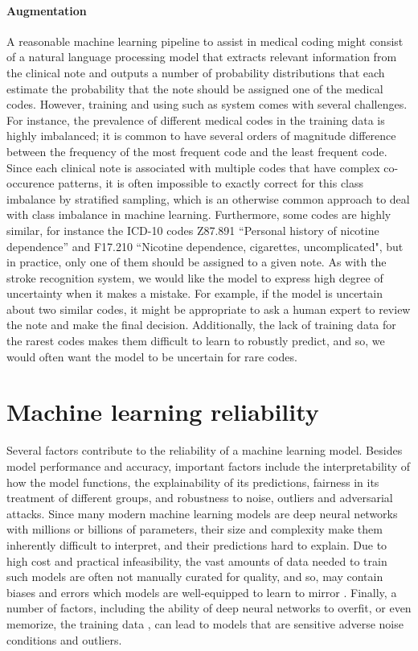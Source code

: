 \paragraph{Augmentation} A reasonable machine learning pipeline to assist in medical coding might consist of a natural language processing model that extracts relevant information from the clinical note and outputs a number of probability distributions that each estimate the probability that the note should be assigned one of the medical codes. 
However, training and using such as system comes with several challenges. 
For instance, the prevalence of different medical codes in the training data is highly imbalanced; it is common to have several orders of magnitude difference between the frequency of the most frequent code and the least frequent code. Since each clinical note is associated with multiple codes that have complex co-occurence patterns, it is often impossible to exactly correct for this class imbalance by stratified sampling, which is an otherwise common approach to deal with class imbalance in machine learning. 
Furthermore, some codes are highly similar, for instance the ICD-10 codes Z87.891 ``Personal history of nicotine dependence'' and F17.210 ``Nicotine dependence, cigarettes, uncomplicated", but in practice, only one of them should be assigned to a given note. 
As with the stroke recognition system, we would like the model to express high degree of uncertainty when it makes a mistake. For example, if the model is uncertain about two similar codes, it might be appropriate to ask a human expert to review the note and make the final decision. Additionally, the lack of training data for the rarest codes makes them difficult to learn to robustly predict, and so, we would often want the model to be uncertain for rare codes. 


\section{Machine learning reliability}
%
Several factors contribute to the reliability of a machine learning model. 
Besides model performance and accuracy, important factors include the interpretability of how the model functions, the explainability of its predictions, fairness in its treatment of different groups, and robustness to noise, outliers and adversarial attacks. 
Since many modern machine learning models are deep neural networks with millions or billions of parameters, their size and complexity make them inherently difficult to interpret, and their predictions hard to explain. Due to high cost and practical infeasibility, the vast amounts of data needed to train such models are often not manually curated for quality, and so, may contain biases and errors which models are well-equipped to learn to mirror \cite{burkart_survey_2021}. 
Finally, a number of factors, including the ability of deep neural networks to overfit, or even memorize, the training data \cite{arpit_closer_2017, burg_memorization_2021}, can lead to models that are sensitive adverse noise conditions and outliers. 

